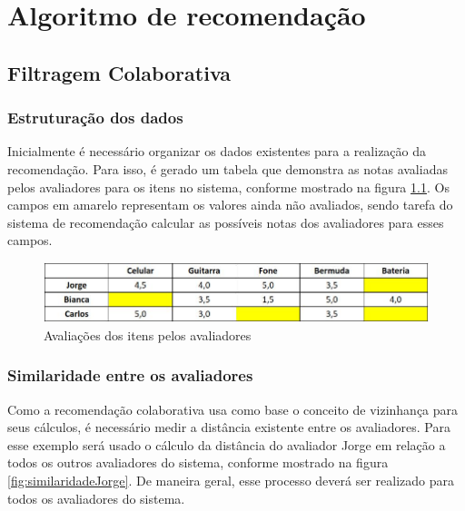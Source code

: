 \anexos

\partanexos*

\chapter{Algoritmo de recomendação}

\section{Filtragem Colaborativa}

\subsection{Estruturação dos dados}

Inicialmente é necessário organizar os dados existentes para a realização da recomendação. Para isso, é gerado um tabela que demonstra as notas avaliadas pelos avaliadores para os itens no sistema, conforme mostrado na figura \ref{fig:avaliacoes}. Os campos em amarelo representam os valores ainda não avaliados, sendo tarefa do sistema de recomendação calcular as possíveis notas dos avaliadores para esses campos.

\begin{figure}[H]
	\centering
	\includegraphics[width=0.8\linewidth]{imagens/recomendacaoAvaliacoes.jpg}
	\caption[Avaliações dos itens pelos avaliadores]{Avaliações dos itens pelos avaliadores}
    \label{fig:avaliacoes}
\end{figure}

\subsection{Similaridade entre os avaliadores}

Como a recomendação colaborativa usa como base o conceito de vizinhança para seus cálculos, é necessário medir a distância existente entre os avaliadores. Para esse exemplo será usado o cálculo da distância do avaliador Jorge em relação a todos os outros avaliadores do sistema, conforme mostrado na figura \ref{fig:similaridadeJorge}. De maneira geral, esse processo deverá ser realizado para todos os avaliadores do sistema.

